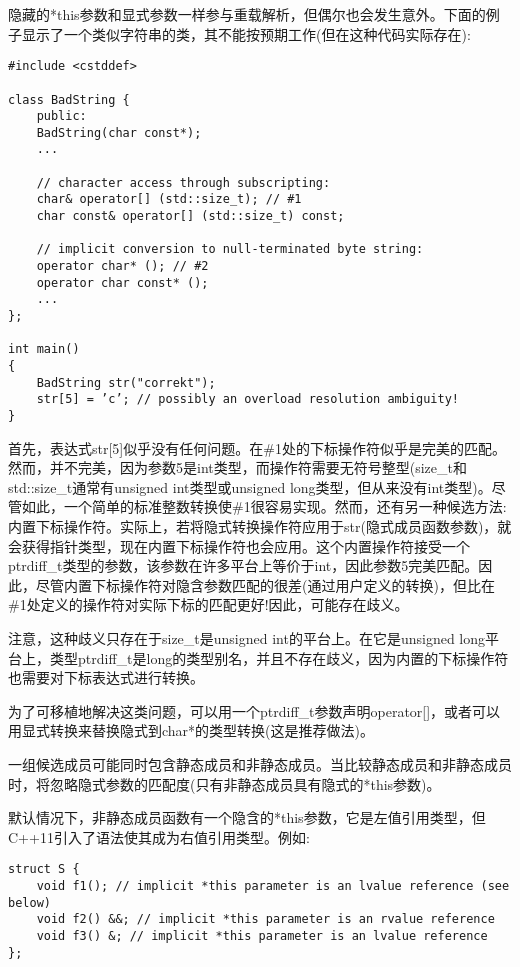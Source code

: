 隐藏的*this参数和显式参数一样参与重载解析，但偶尔也会发生意外。下面的例子显示了一个类似字符串的类，其不能按预期工作(但在这种代码实际存在):

\begin{lstlisting}[style=styleCXX]
#include <cstddef>

class BadString {
	public:
	BadString(char const*);
	...
	
	// character access through subscripting:
	char& operator[] (std::size_t); // #1
	char const& operator[] (std::size_t) const;
	
	// implicit conversion to null-terminated byte string:
	operator char* (); // #2
	operator char const* ();
	...
};

int main()
{
	BadString str("correkt");
	str[5] = ’c’; // possibly an overload resolution ambiguity!
}
\end{lstlisting}

首先，表达式str[5]似乎没有任何问题。在\#1处的下标操作符似乎是完美的匹配。然而，并不完美，因为参数5是int类型，而操作符需要无符号整型(size\_t和std::size\_t通常有unsigned int类型或unsigned long类型，但从来没有int类型)。尽管如此，一个简单的标准整数转换使\#1很容易实现。然而，还有另一种候选方法:内置下标操作符。实际上，若将隐式转换操作符应用于str(隐式成员函数参数)，就会获得指针类型，现在内置下标操作符也会应用。这个内置操作符接受一个ptrdiff\_t类型的参数，该参数在许多平台上等价于int，因此参数5完美匹配。因此，尽管内置下标操作符对隐含参数匹配的很差(通过用户定义的转换)，但比在\#1处定义的操作符对实际下标的匹配更好!因此，可能存在歧义。

\begin{tcolorbox}[colback=webgreen!5!white,colframe=webgreen!75!black]
\hspace*{0.75cm}注意，这种歧义只存在于size\_t是unsigned int的平台上。在它是unsigned long平台上，类型ptrdiff\_t是long的类型别名，并且不存在歧义，因为内置的下标操作符也需要对下标表达式进行转换。
\end{tcolorbox}

为了可移植地解决这类问题，可以用一个ptrdiff\_t参数声明operator[]，或者可以用显式转换来替换隐式到char*的类型转换(这是推荐做法)。

一组候选成员可能同时包含静态成员和非静态成员。当比较静态成员和非静态成员时，将忽略隐式参数的匹配度(只有非静态成员具有隐式的*this参数)。

默认情况下，非静态成员函数有一个隐含的*this参数，它是左值引用类型，但C++11引入了语法使其成为右值引用类型。例如:

\begin{lstlisting}[style=styleCXX]
struct S {
	void f1(); // implicit *this parameter is an lvalue reference (see below)
	void f2() &&; // implicit *this parameter is an rvalue reference
	void f3() &; // implicit *this parameter is an lvalue reference
};
\end{lstlisting}

